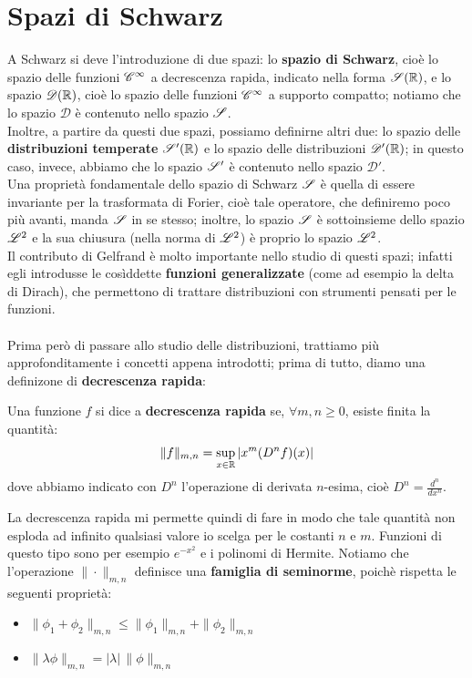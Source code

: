 \section{Spazi di Schwarz}
A Schwarz si deve l'introduzione di due spazi: lo \textbf{spazio di Schwarz}, cioè lo spazio delle funzioni $\cont^{\infty}$ a decrescenza rapida, indicato nella forma $\S(\R)$, e lo spazio $\mathscr{D}(\R)$, cioè lo spazio delle funzioni $\cont^{\infty}$ a supporto compatto; notiamo che lo spazio $\mathscr{D}$ è contenuto nello spazio $\S$.\\
Inoltre, a partire da questi due spazi, possiamo definirne altri due: lo spazio delle \textbf{distribuzioni temperate} $\S'(\R)$ e lo spazio delle distribuzioni $\mathscr{D}'(\R)$; in questo caso, invece, abbiamo che lo spazio $\S'$ è contenuto nello spazio $\mathscr{D}'$.\\
Una proprietà fondamentale dello spazio di Schwarz $\S$ è quella di essere invariante per la trasformata di Forier, cioè tale operatore, che definiremo poco più avanti, manda $\S$ in se stesso; inoltre, lo spazio $\S$ è sottoinsieme dello spazio $\L^2$ e la sua chiusura (nella norma di $\L^2$) è proprio lo spazio $\L^2$.\\
Il contributo di Gelfrand è molto importante nello studio di questi spazi; infatti egli introdusse le cosìddette \textbf{funzioni generalizzate} (come ad esempio la delta di Dirach), che permettono di trattare distribuzioni con strumenti pensati per le funzioni.
\\
\\
Prima però di passare allo studio delle distribuzioni, trattiamo più approfonditamente  i concetti appena introdotti; prima di tutto, diamo una definizone di \textbf{decrescenza rapida}:
\begin{definizione}
Una funzione $f$ si dice a \textbf{decrescenza rapida} se, $\forall m,n \geq 0$, esiste finita la quantità:
$$\|f\|_{m,n} = \sup_{x \in \R} |x^m (D^n f)(x)|$$
dove abbiamo indicato con $D^n$ l'operazione di derivata $n$-esima, cioè $D^n=\frac{d^n}{dx^n}$.
\end{definizione}
La decrescenza rapida mi permette quindi di fare in modo che tale quantità non esploda ad infinito qualsiasi valore io scelga per le costanti $n$ e $m$. Funzioni di questo tipo sono per esempio $e^{-x^2}$ e i polinomi di Hermite. Notiamo che l'operazione $\| \cdot \|_{m,n}$ definisce una \textbf{famiglia di seminorme}, poichè rispetta le seguenti proprietà:
\begin{itemize}
\item $\| \phi_1 + \phi_2 \|_{m,n} \leq \| \phi_1\|_{m,n} + \|\phi_2\|_{m,n}$
\item $\| \lambda \phi \|_{m,n} = | \lambda | \, \| \phi \|_{m,n}$
\end{itemize}
